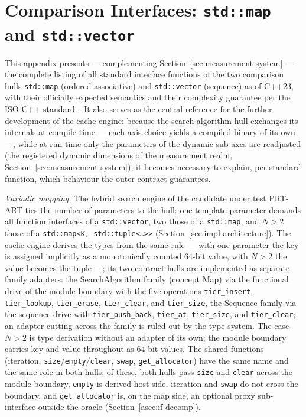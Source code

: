 \chapter{Comparison Interfaces: \texttt{std::map} and \texttt{std::vector}}\label{app:interfaces}

This appendix presents --- complementing Section~\ref{sec:measurement-system} --- the complete
listing of all standard interface functions of the two comparison hulls \texttt{std::map} (ordered
associative) and \texttt{std::vector} (sequence) as of C++23, with their officially expected
semantics and their complexity guarantee per the ISO C++ standard~\cite{iso_cpp}. It also serves as
the central reference for the further development of the cache engine: because the search-algorithm
hull exchanges its internals at compile time --- each axis choice yields a compiled binary of its own
---, while at run time only the parameters of the dynamic sub-axes are readjusted (the registered
dynamic dimensions of the measurement realm, Section~\ref{sec:measurement-system}), it becomes
necessary to explain, per standard function, which behaviour the outer contract guarantees.

\emph{Variadic mapping.} The hybrid search engine of the candidate under test PRT-ART ties the number of
parameters to the hull: one template parameter demands all function interfaces of a
\texttt{std::vector}, two those of a \texttt{std::map}, and $N>2$ those of a
\texttt{std::map<K,\,std::tuple<\ldots>>} (Section~\ref{sec:impl-architecture}). The cache engine
derives the types from the same rule --- with one parameter the key is assigned implicitly as a
monotonically counted 64-bit value, with $N>2$ the value becomes the tuple ---; its two contract
hulls are implemented as separate family adapters: the SearchAlgorithm family (concept Map) via the
functional drive of the
module boundary with the five operations \texttt{tier\_insert}, \texttt{tier\_lookup},
\texttt{tier\_erase}, \texttt{tier\_clear}, and \texttt{tier\_size}, the Sequence family via the
sequence drive with \texttt{tier\_push\_back}, \texttt{tier\_at}, \texttt{tier\_size}, and
\texttt{tier\_clear}; an adapter cutting across the family is ruled out by the type system. The case
$N>2$ is type derivation without an adapter of its own; the module boundary carries key and value
throughout as 64-bit values. The shared functions (iteration,
\texttt{size}/\texttt{empty}/\texttt{clear}, \texttt{swap}, \texttt{get\_allocator}) have the same
name and the same role in both hulls; of these, both hulls pass \texttt{size} and \texttt{clear}
across the module boundary, \texttt{empty} is derived host-side, iteration and \texttt{swap} do not
cross the boundary, and \texttt{get\_allocator} is, on the map side, an optional proxy sub-interface
outside the oracle (Section~\ref{asec:if-decomp}).


